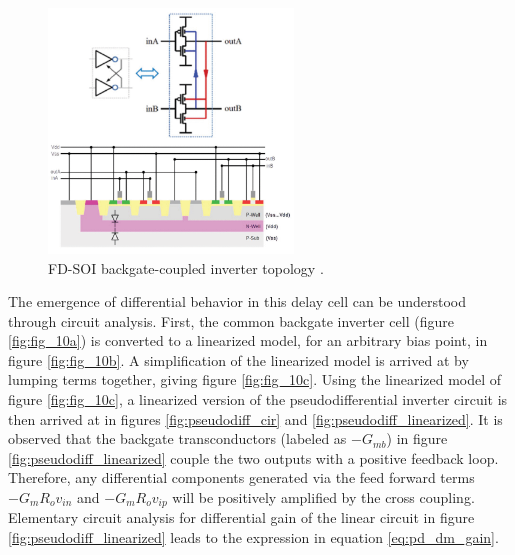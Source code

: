 		\begin{figure}[htb!]
		        \centering
		        \includegraphics[width=0.58\textwidth, angle=0]{./figs/design/jacqu2-1-large.png}
		    \caption{FD-SOI backgate-coupled inverter topology \cite{Jacquemod2019}.}
		    \label{fig:bg_inv_jacqu}
		\end{figure}	

		The emergence of differential behavior in this delay cell can be understood through circuit analysis. First, the common backgate inverter cell (figure \ref{fig:fig_10a}) is converted to a linearized model, for an arbitrary bias point, in figure \ref{fig:fig_10b}. A simplification of the linearized model is arrived at by lumping terms together, giving figure \ref{fig:fig_10c}. Using the linearized model of figure \ref{fig:fig_10c}, a linearized version of the pseudodifferential inverter circuit is then arrived at in figures \ref{fig:pseudodiff_cir} and \ref{fig:pseudodiff_linearized}. It is observed that the backgate transconductors (labeled as $-G_{mb}$) in figure \ref{fig:pseudodiff_linearized} couple the two outputs with a positive feedback loop. Therefore, any differential components generated via the feed forward terms $-G_m R_o v_{in}$ and $-G_m R_o v_{ip}$ will be positively amplified by the cross coupling. Elementary circuit analysis for differential gain of the linear circuit in figure \ref{fig:pseudodiff_linearized} leads to the expression in equation \ref{eq:pd_dm_gain}.

